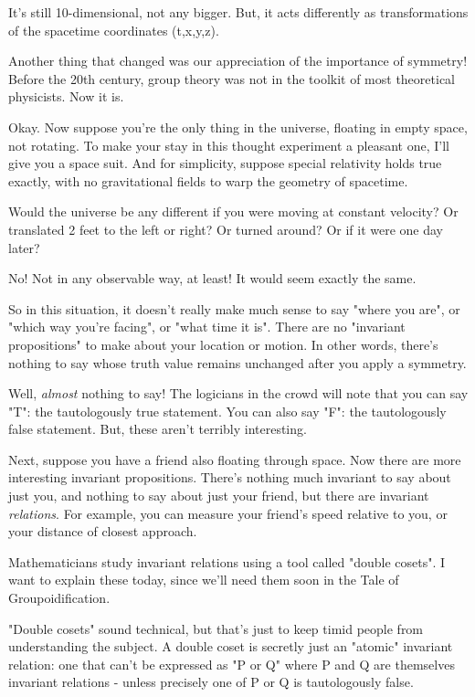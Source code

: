 It's still 10-dimensional, not any bigger.  But, it acts differently
as transformations of the spacetime coordinates (t,x,y,z).  

Another thing that changed was our appreciation of the importance 
of symmetry!  Before the 20th century, group theory was not in the 
toolkit of most theoretical physicists.   Now it is.   

Okay.  Now suppose you're the only thing in the universe, floating in
empty space, not rotating.  To make your stay in this thought experiment 
a pleasant one, I'll give you a space suit.  And for simplicity, suppose
special relativity holds true exactly, with no gravitational fields 
to warp the geometry of spacetime.  

Would the universe be any different if you were moving at constant 
velocity?  Or translated 2 feet to the left or right?  Or turned 
around?  Or if it were one day later?

No!   Not in any observable way, at least!  It would seem exactly 
the same.  

So in this situation, it doesn't really make much sense to say
"where you are", or "which way you're facing", or
"what time it is".  There are no "invariant
propositions" to make about your location or motion.  In other
words, there's nothing to say whose truth value remains unchanged
after you apply a symmetry.

Well, \emph{almost} nothing to say!  The logicians in the crowd will
note that you can say "T": the tautologously true statement.
You can also say "F": the tautologously false statement.
But, these aren't terribly interesting.

Next, suppose you have a friend also floating through space.  Now
there are more interesting invariant propositions.  There's nothing
much invariant to say about just you, and nothing to say about just your
friend, but there are invariant \emph{relations}. For example, you
can measure your friend's speed relative to you, or your distance of
closest approach.

Mathematicians study invariant relations using a tool called "double
cosets".  I want to explain these today, since we'll need them soon 
in the Tale of Groupoidification.  

"Double cosets" sound technical, but that's just to keep timid
people from understanding the subject.  A double coset is secretly
just an "atomic" invariant relation: one that can't be
expressed as "P or Q" where P and Q are themselves invariant
relations - unless precisely one of P or Q is tautologously false.


